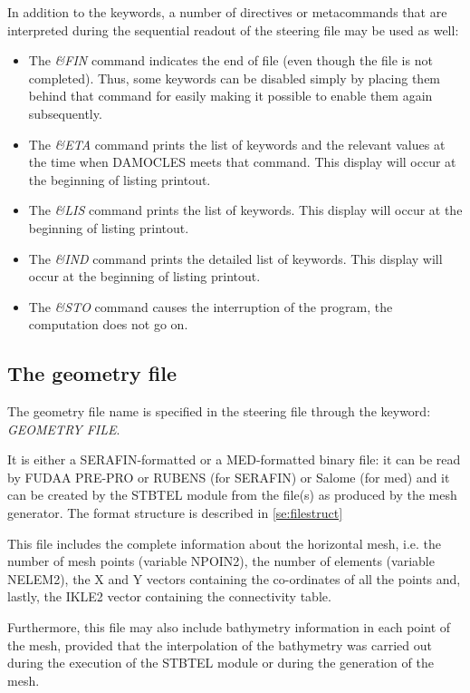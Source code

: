  In addition to the keywords, a number of directives or metacommands that are interpreted during the sequential readout of the steering file may be used as well:

\begin{itemize}
\item  The \textit{\&FIN} command indicates the end of file (even though the file is not completed). Thus, some keywords can be disabled simply by placing them behind that command for easily making it possible to enable them again subsequently.

\item  The \textit{\&ETA} command prints the list of keywords and the relevant values at the time when DAMOCLES meets that command. This display will occur at the beginning of listing printout.

\item  The \textit{\&LIS} command prints the list of keywords. This display will occur at the beginning of listing printout.

\item  The \textit{\&IND} command prints the detailed list of keywords. This display will occur at the beginning of listing printout.

\item  The \textit{\&STO} command causes the interruption of the program, the computation does not go on.
\end{itemize}


\subsection{ The geometry file}

 The geometry file name is specified in the steering file through the keyword: \textit{GEOMETRY FILE}.

 It is either a SERAFIN-formatted or a MED-formatted binary file: it can be read by FUDAA PRE-PRO or RUBENS (for SERAFIN) or Salome (for med) and it can be created by the STBTEL module from the file(s) as produced by the mesh generator. The format structure is described in \ref{se:filestruct}

 This file includes the complete information about the horizontal mesh, i.e. the number of mesh points (variable NPOIN2), the number of elements (variable NELEM2), the X and Y vectors containing the co-ordinates of all the points and, lastly, the IKLE2 vector containing the connectivity table.

 Furthermore, this file may also include bathymetry information in each point of the mesh, provided that the interpolation of the bathymetry was carried out during the execution of the STBTEL module or during the generation of the mesh.

